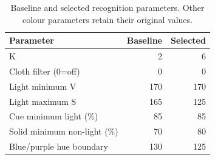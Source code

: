 \begin{table}[htbp]
\centering
\small
\caption{Baseline and selected recognition parameters. Other colour parameters retain their original values.}
\label{tab:recognition-search-parameters}
\begin{tabular}{lrr}
\toprule
Parameter & Baseline & Selected \\
\midrule
K & 2 & 6 \\
Cloth filter (0=off) & 0 & 0 \\
Light minimum V & 170 & 170 \\
Light maximum S & 165 & 125 \\
Cue minimum light (\%) & 85 & 85 \\
Solid minimum non-light (\%) & 70 & 80 \\
Blue/purple hue boundary & 130 & 125 \\
\bottomrule
\end{tabular}
\end{table}
\FloatBarrier
